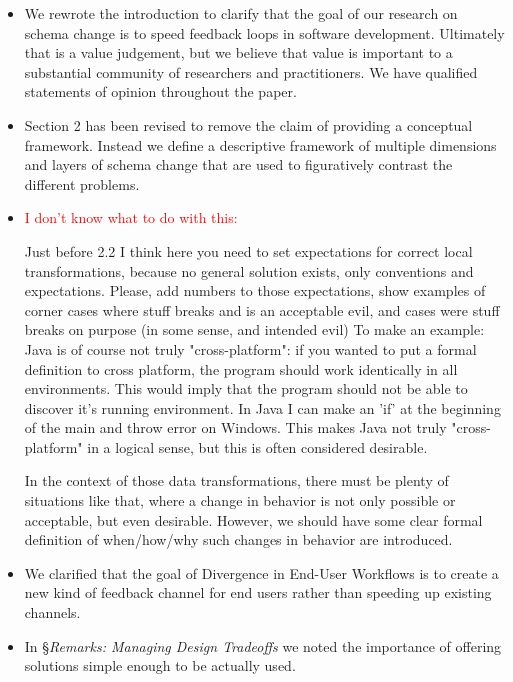 \documentclass{article}
\begin{document}
\begin{itemize}
  \item We rewrote the introduction to clarify that the goal of our research on schema change is to speed feedback loops in software development. Ultimately that is a value judgement, but we believe that value is important to a substantial community of researchers and practitioners. We have qualified statements of opinion throughout the paper.

  \item Section 2 has been revised to remove the claim of providing a conceptual framework. Instead we define a descriptive framework of multiple dimensions and layers of schema change that are used to figuratively contrast the different problems.

  \item \textcolor{red}{I don't know what to do with this:}
\begin{displayquote}
  Just before 2.2 I think here you need to set expectations for correct local transformations, because no general solution exists, only conventions and expectations. Please, add numbers to those expectations, show examples of corner cases where stuff breaks and is an acceptable evil, and cases were stuff breaks on purpose (in some sense, and intended evil) To make an example: Java is of course not truly "cross-platform": if you wanted to put a formal definition to cross platform, the program should work identically in all environments. This would imply that the program should not be able to discover it's running environment. In Java I can make an 'if' at the beginning of the main and throw error on Windows. This makes Java not truly "cross-platform" in a logical sense, but this is often considered desirable.

  In the context of those data transformations, there must be plenty of situations like that, where a change in behavior is not only possible or acceptable, but even desirable. However, we should have some clear formal definition of when/how/why such changes in behavior are introduced.
\end{displayquote}

\item We clarified that the goal of Divergence in End-User Workflows is to create a new kind of feedback channel for end users rather than speeding up existing channels.

\item In \S\emph{Remarks: Managing Design Tradeoffs} we noted the importance of offering solutions simple enough to be actually used.
\end{itemize}
\end{document}
